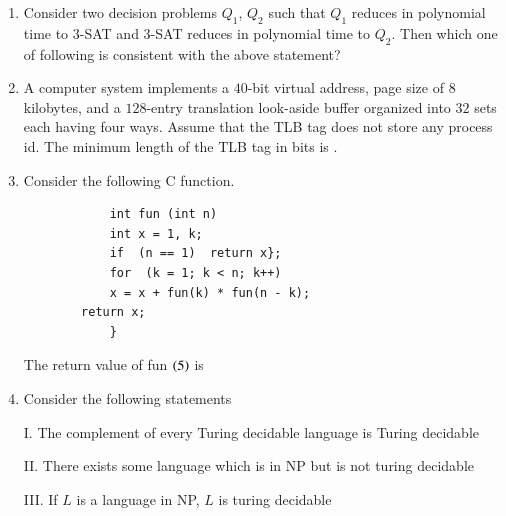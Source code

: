 \documentclass[journal,12pt,onecolumn]{IEEEtran}
\theoremstyle{remark}
\begin{document}
\begin{enumerate}
		\item Consider two decision problems $Q_1$, $Q_2$ such that $Q_1$ reduces in polynomial time to $3$-SAT and $3$-SAT reduces in polynomial time to $Q_2$. Then which one of following is consistent with the above statement?
		\hfill{}
		
		\begin{enumerate}
		\end{enumerate}
		
		\item A computer system implements a $40$-bit virtual address, page size of $8$ kilobytes, and a $128$-entry translation look-aside buffer  organized into $32$ sets each having four ways. Assume that the TLB tag does not store any process id. The minimum length of the TLB tag in bits is \underline{\hspace{2cm}}.
		
		\hfill{}
		
		\item Consider the following C function.
		
\begin{verbatim}
			int fun (int n) 
			int x = 1, k;
			if  (n == 1)  return x};
			for  (k = 1; k < n; k++)
			x = x + fun(k) * fun(n - k);
		return x;
			}
\end{verbatim}

		The return value of fun $\left(5\right)$ is \underline{\hspace{2cm}}
		
		\hfill{}
		
		\item Consider the following statements
		
		I. The complement of every Turing decidable language is Turing decidable
		
		II. There exists some language which is in NP but is not turing decidable
		
		III. If $L$ is a language in NP, $L$ is turing decidable
		

\end{enumerate}
\end{document}
